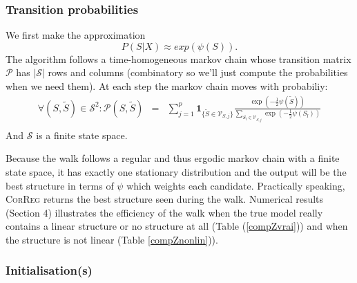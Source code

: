 \documentclass[11pt,a4paper]{article}
\begin{document}
	\subsubsection{Transition probabilities}
	We first make the approximation
	\begin{equation}
		P(S|X)\approx exp(\psi(S)).
	\end{equation}
	The algorithm follows a time-homogeneous markov chain whose transition matrix $\mathcal{P}$ has $|\mathcal{S}|$ rows and columns (combinatory so we'll just compute the probabilities when we need them).
	At each step the markov chain moves with probabiliy:
	\begin{eqnarray}
			\forall (S,\tilde{S}) \in \mathcal{S}^2 : \mathcal{P}(S,\tilde{S})&=&\sum_{j=1}^p \mathbf{1}_{ \{\tilde{S}\in \mathcal{V}_{S,j}\} }\frac{\exp(-\frac{1}{2} \psi(\tilde{S}))}{\sum_{S_l\in \mathcal{V}_{S,j}}\exp(-\frac{1}{2}\psi(S_l))} \\
	\end{eqnarray}
	And $\mathcal{S}$ is a finite state space.%
	 
Because the walk follows a regular and thus ergodic markov chain with a finite state space, it has exactly one stationary distribution \cite{grinstead1997introduction} %
%	
%	
%		
and the output will be the best structure in terms of $\psi$ which weights each candidate. Practically speaking, \textsc{CorReg} returns the best structure seen during the walk.
Numerical results (Section 4) illustrates the efficiency of the walk when the true model really contains a linear structure or no structure at all (Table (\ref{compZvrai})) and when the structure is not linear (Table \ref{compZnonlin})).

 \subsubsection{Initialisation(s)}
\end{document}
